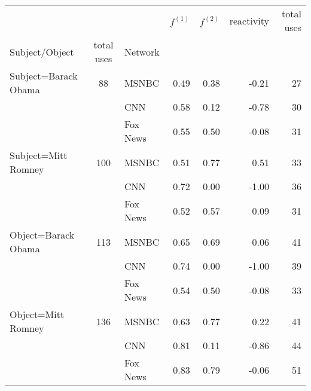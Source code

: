 \begin{tabular}{lclrrrr}
\toprule
                 &   &     & $f^{(1)}$ & $f^{(2)}$ & reactivity & total uses \\
  Subject/Object & total uses & Network &           &           &            &            \\
\midrule
  Subject=Barack Obama & 88 &MSNBC &      0.49 &      0.38 &      -0.21 &         27 \\
                     & & CNN &      0.58 &      0.12 &      -0.78 &         30 \\
                     & & Fox News &      0.55 &      0.50 &      -0.08 &         31 \\
\hline
  Subject=Mitt Romney& 100 & MSNBC &      0.51 &      0.77 &       0.51 &         33 \\
                     & & CNN &      0.72 &      0.00 &      -1.00 &         36 \\
                     & & Fox News &      0.52 &      0.57 &       0.09 &         31 \\
\hline
  Object=Barack Obama&113 & MSNBC &      0.65 &      0.69 &       0.06 &         41 \\
                     & & CNN &      0.74 &      0.00 &      -1.00 &         39 \\
                     & & Fox News &      0.54 &      0.50 &      -0.08 &         33 \\
\hline
  Object=Mitt Romney& 136& MSNBC &      0.63 &      0.77 &       0.22 &         41 \\
                    &  & CNN &      0.81 &      0.11 &      -0.86 &         44 \\
                    &  & Fox News &      0.83 &      0.79 &      -0.06 &         51 \\
\bottomrule
\end{tabular}
